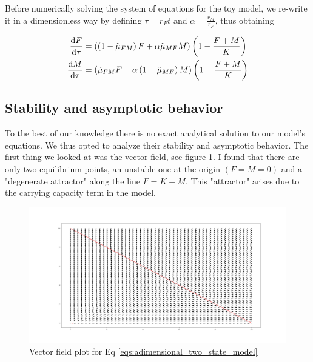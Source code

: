 \documentclass[10pt,a4paper]{scrartcl}
\begin{document}
Before numerically solving the system of equations for the toy model, we re-write it in a dimensionless way by defining $\tau = r_F t$ and $\alpha = \frac{r_M}{r_F}$, thus obtaining  

\begin{subequations}\label{eqs:adimensional_two_state_model}
\begin{align}
\dv{F}{\tau} &= \left( \left(1 - \Tilde{\mu}_{FM}\right)F + \alpha \Tilde{\mu}_{MF} M\right) \left(1-\frac{F + M}{K}\right)\\
\dv{M}{\tau} &= \left( \Tilde{\mu}_{FM} F + \alpha\left(1 - \Tilde{\mu}_{MF}\right)M\right) \left(1-\frac{F + M}{K}\right)
\end{align}
\end{subequations}


\subsection*{Stability and asymptotic behavior}

To the best of our knowledge there is no exact analytical solution to our model's equations.  We thus opted to analyze their stability and asymptotic behavior. The first thing we looked at was the vector field, see figure \ref{fig:vector_field_2st}. I found that there are only two equilibrium points, an unstable one at the origin $(F = M = 0)$ and a "degenerate attractor" along the line $F = K - M$. This "attractor" arises due to the carrying capacity term in the model. 

\begin{figure}
    \centering
    \includegraphics[width=1\linewidth]{plots/vector_field.png}
    \caption{Vector field plot for Eq \ref{eqs:adimensional_two_state_model}}
    \label{fig:vector_field_2st}
\end{figure}
\end{document}
